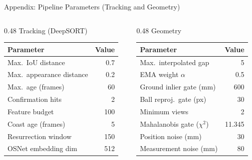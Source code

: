 \begin{frame}{Appendix: Pipeline Parameters (Tracking and Geometry)}
\scriptsize
\begin{columns}[T]
  \begin{column}{0.48\textwidth}
    \centering Tracking (DeepSORT)\\[2pt]
    \begin{tabular}{lr}
      \toprule
      Parameter & Value \\
      \midrule
      Max.\ IoU distance        & 0.7 \\
      Max.\ appearance distance & 0.2 \\
      Max.\ age (frames)        & 60 \\
      Confirmation hits         & 2 \\
      Feature budget            & 100 \\
      Coast age (frames)        & 5 \\
      Resurrection window       & 150 \\
      OSNet embedding dim       & 512 \\
      \bottomrule
    \end{tabular}
  \end{column}
  \begin{column}{0.48\textwidth}
    \centering Geometry\\[2pt]
    \begin{tabular}{lr}
      \toprule
      Parameter & Value \\
      \midrule
      Max.\ interpolated gap     & 5 \\
      EMA weight $\alpha$        & 0.5 \\
      Ground inlier gate (mm)    & 600 \\
      Ball reproj.\ gate (px)    & 30 \\
      Minimum views              & 2 \\
      Mahalanobis gate ($\chi^2$) & 11.345 \\
      Position noise (mm)        & 30 \\
      Measurement noise (mm)     & 80 \\
      \bottomrule
    \end{tabular}
  \end{column}
\end{columns}
\end{frame}

